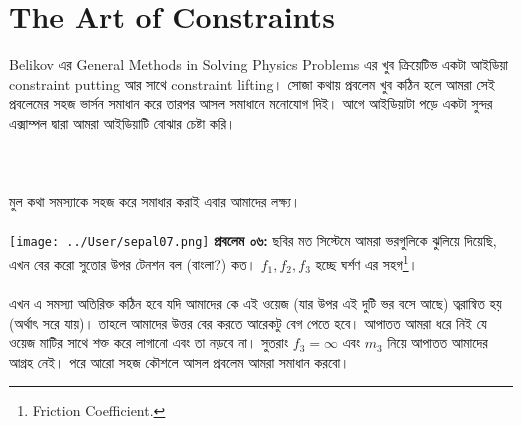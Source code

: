 \documentclass[12pt,a4paper]{article}
\begin{document}
\section{The Art of Constraints}
Belikov এর General Methods in Solving Physics Problems এর খুব ক্রিয়েটিভ একটা আইডিয়া constraint putting আর সাথে constraint lifting। সোজা কথায় প্রবলেম খুব কঠিন হলে আমরা সেই প্রবলেমের সহজ ভার্সন সমাধান করে তারপর আসল সমাধানে মনোযোগ দিই। আগে আইডিয়াটা পড়ে একটা সুন্দর এক্সাম্পল দ্বারা আমরা আইডিয়াটি বোঝার চেষ্টা করি। 
\\
\\
\\
\\
মুল কথা সমস্যাকে সহজ করে সমাধার করাই এবার আমাদের লক্ষ্য। \\
\\
\texttt{[image: ../User/sepal07.png]} 
\textbf{প্রবলেম ০৬:} ছবির মত সিস্টেমে আমরা ভরগুলিকে ঝুলিয়ে দিয়েছি, এখন বের করো সুতোর উপর টেনশন বল (বাংলা?) কত। $f_1,f_2,f_3$ হচ্ছে ঘর্শণ এর সহগ\footnote{Friction Coefficient.}।\\
\\
এখন এ সমস্যা অতিরিক্ত কঠিন হবে যদি আমাদের কে এই ওয়েজ (যার উপর এই দুটি ভর বসে আছে) ত্বরান্বিত হয় (অর্থাৎ সরে যায়)। তাহলে আমাদের উত্তর বের করতে আরেকটু বেগ পেতে হবে। আপাতত আমরা ধরে নিই যে ওয়েজ মাটির সাথে শক্ত করে লাগানো এবং তা নড়বে না। সুতরাং $f_3 = \infty$ এবং $m_3$ নিয়ে আপাতত আমাদের আগ্রহ নেই। পরে আরো সহজ কৌশলে আসল প্রবলেম আমরা সমাধান করবো। 
\end{document}
